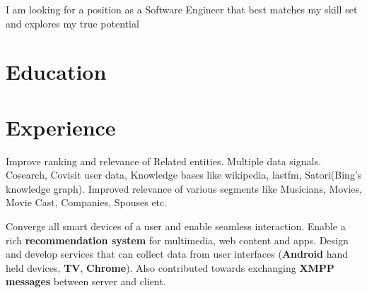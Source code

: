 \documentclass[13pt,a4paper,roman]{moderncv}   %
\begin{document}
\makecvtitle
I am looking for a position as a Software Engineer that best matches my skill set and explores my true potential

\section{Education}



\section{Experience}
{\vspace{1 mm}\normalsize Improve ranking and relevance of Related entities. Multiple data signals. Cosearch, Covisit user data, Knowledge bases like wikipedia, lastfm, Satori(Bing's knowledge graph). Improved relevance of various segments like Musicians, Movies, Movie Cast, Companies, Spouses etc.}

\vspace{3 mm}

{\vspace{1 mm} \normalsize Converge all smart devices of a user and enable seamless interaction. Enable a rich \textbf{recommendation system} for multimedia, web content and apps. Design and develop services that can collect data from user interfaces (\textbf{Android} hand held devices, \textbf{TV}, \textbf{Chrome}). Also contributed towards exchanging \textbf{XMPP messages} between server and client.}
\end{document}
